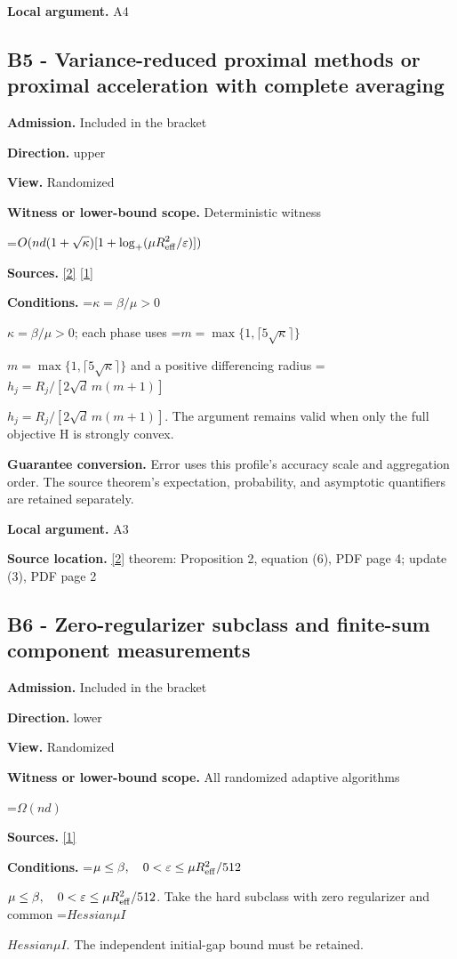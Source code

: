 \documentclass[10pt,a4paper]{article}
\newcommand{\AtlasMath}[1]{\par\begingroup\centering\setbox0=\hbox{$\displaystyle #1$}\ifdim\wd0>1.4\linewidth\typeout{ATLAS WIDE FORMULA: \the\wd0}\fi\ifdim\wd0>\linewidth\resizebox{\linewidth}{!}{\box0}\else\box0\fi\par\endgroup}
\newcommand{\AtlasInlineMath}[1]{\begingroup\setbox0=\hbox{$#1$}\ifdim\wd0>.4\linewidth\endgroup\AtlasMath{#1}\else\endgroup$#1$\fi}
\begin{document}
\textbf{Local argument.} A4

\subsection{B5 - Variance-reduced proximal methods or proximal acceleration with complete averaging}
\textbf{Admission.} Included in the bracket

\textbf{Direction.} upper

\textbf{View.} Randomized

\textbf{Witness or lower-bound scope.} Deterministic witness

\AtlasMath{O(nd(1+\sqrt\kappa)[1+\log_+(\mu R_{\rm eff}^2/\varepsilon)])}
\textbf{Sources.} \href{https://papers.neurips.cc/paper_files/paper/2011/file/8f7d807e1f53eff5f9efbe5cb81090fb-Paper.pdf}{[2]} \href{https://arxiv.org/html/2610.00345v1}{[1]}

\textbf{Conditions.} \AtlasInlineMath{\kappa=\beta/\mu>0}; each phase uses \AtlasInlineMath{m=\max\{1,\lceil5\sqrt\kappa\rceil\}} and a positive differencing radius \AtlasInlineMath{h_j=R_j/[2\sqrt d\,m(m+1)]}. The argument remains valid when only the full objective H is strongly convex.

\textbf{Guarantee conversion.} Error uses this profile's accuracy scale and aggregation order. The source theorem's expectation, probability, and asymptotic quantifiers are retained separately.

\textbf{Local argument.} A3

\textbf{Source location.} \href{https://papers.neurips.cc/paper_files/paper/2011/file/8f7d807e1f53eff5f9efbe5cb81090fb-Paper.pdf}{[2]} theorem: Proposition 2, equation (6), PDF page 4; update (3), PDF page 2

\subsection{B6 - Zero-regularizer subclass and finite-sum component measurements}
\textbf{Admission.} Included in the bracket

\textbf{Direction.} lower

\textbf{View.} Randomized

\textbf{Witness or lower-bound scope.} All randomized adaptive algorithms

\AtlasMath{\Omega(nd)}
\textbf{Sources.} \href{https://arxiv.org/html/2610.00345v1}{[1]}

\textbf{Conditions.} \AtlasInlineMath{\mu\le\beta,\quad0<\varepsilon\le\mu R_{\rm eff}^2/512}. Take the hard subclass with zero regularizer and common \AtlasInlineMath{Hessian \mu I}. The independent initial-gap bound must be retained.
\end{document}
